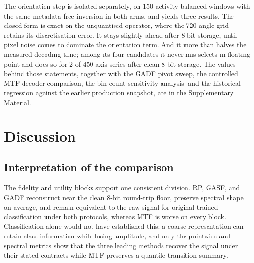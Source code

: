 \documentclass[preprint,12pt]{elsarticle}
\begin{document}
The orientation step is isolated separately, on 150 activity-balanced windows with the same metadata-free inversion in both arms, and yields three results. The closed form is exact on the unquantised operator, where the 720-angle grid retains its discretisation error. It stays slightly ahead after 8-bit storage, until pixel noise comes to dominate the orientation term. And it more than halves the measured decoding time; among its four candidates it never mis-selects in floating point and does so for 2 of 450 axis-series after clean 8-bit storage. The values behind those statements, together with the GADF pivot sweep, the controlled MTF decoder comparison, the bin-count sensitivity analysis, and the historical regression against the earlier production snapshot, are in the Supplementary Material.

\begin{table}[H]
\centering
\caption{Compact decoder-ablation summary. MAE is in physical units (m/s\(^2\)); the sample and controlled factors for each row are detailed in the Supplementary Material.}\label{tab:ablation_summary}
\small
{}
\end{table}

\section{Discussion}\label{sec:discussion}

\subsection{Interpretation of the comparison}\label{sec:disc_pointwise}

The fidelity and utility blocks support one consistent division. RP, GASF, and GADF reconstruct near the clean 8-bit round-trip floor, preserve spectral shape on average, and remain equivalent to the raw signal for original-trained classification under both protocols, whereas MTF is worse on every block. Classification alone would not have established this: a coarse representation can retain class information while losing amplitude, and only the pointwise and spectral metrics show that the three leading methods recover the signal under their stated contracts while MTF preserves a quantile-transition summary.
\end{document}
